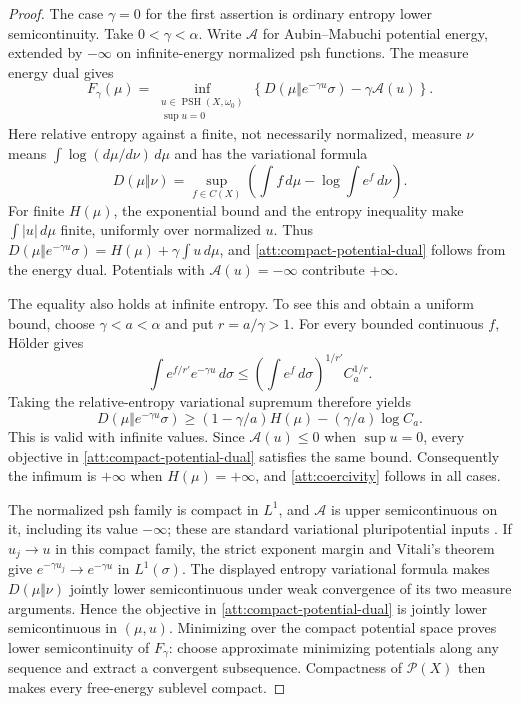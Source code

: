 \begin{proof}
The case $\gamma=0$ for the first assertion is ordinary entropy lower
semicontinuity. Take $0<\gamma<\alpha$. Write $\mathcal A$ for
Aubin--Mabuchi potential energy, extended by $-\infty$ on infinite-energy
normalized psh functions. The measure energy dual gives
\begin{equation}
 F_\gamma(\mu)=
 \inf_{\substack{u\in\operatorname{PSH}(X,\omega_0)\\\sup u=0}}
 \left\{D(\mu\Vert e^{-\gamma u}\sigma)
                       -\gamma\mathcal A(u)\right\}.
 \label{att:compact-potential-dual}
\end{equation}
Here relative entropy against a finite, not necessarily normalized,
measure $\nu$ means $\int\log(d\mu/d\nu)\,d\mu$ and has the
variational formula
\[
 D(\mu\Vert\nu)=\sup_{f\in C(X)}
       \left(\int f\,d\mu-\log\int e^f\,d\nu\right).
\]
For finite $H(\mu)$, the exponential bound and the entropy inequality
make $\int|u|\,d\mu$ finite, uniformly over normalized $u$.
Thus $D(\mu\Vert e^{-\gamma u}\sigma)=H(\mu)+\gamma\int u\,d\mu$,
and \eqref{att:compact-potential-dual} follows from the energy dual.
Potentials with $\mathcal A(u)=-\infty$ contribute $+\infty$.

The equality also holds at infinite entropy. To see this and obtain a
uniform bound, choose $\gamma<a<\alpha$ and put $r=a/\gamma>1$.
For every bounded continuous $f$, H\"older gives
\[
 \int e^{f/r'}e^{-\gamma u}\,d\sigma
 \le \left(\int e^f\,d\sigma\right)^{1/r'} C_a^{1/r}.
\]
Taking the relative-entropy variational supremum therefore yields
\[
 D(\mu\Vert e^{-\gamma u}\sigma)
 \ge (1-\gamma/a)H(\mu)-(\gamma/a)\log C_a.
\]
This is valid with infinite values. Since $\mathcal A(u)\le0$ when
$\sup u=0$, every objective in \eqref{att:compact-potential-dual}
satisfies the same bound. Consequently the infimum is $+\infty$ when
$H(\mu)=+\infty$, and \eqref{att:coercivity} follows in all cases.

The normalized psh family is compact in $L^1$, and $\mathcal A$ is
upper semicontinuous on it, including its value $-\infty$; these are
standard variational pluripotential inputs \cite{BBGZ2013}.
If $u_j\to u$ in this compact family, the strict exponent margin
and Vitali's theorem give
$e^{-\gamma u_j}\to e^{-\gamma u}$ in $L^1(\sigma)$.
The displayed entropy variational formula makes $D(\mu\Vert\nu)$
jointly lower semicontinuous under weak convergence of its two measure
arguments. Hence the objective in \eqref{att:compact-potential-dual}
is jointly lower semicontinuous in $(\mu,u)$. Minimizing over the
compact potential space proves lower semicontinuity of $F_\gamma$:
choose approximate minimizing potentials along any sequence and extract
a convergent subsequence. Compactness of $\mathcal P(X)$ then makes
every free-energy sublevel compact.


\end{proof}

